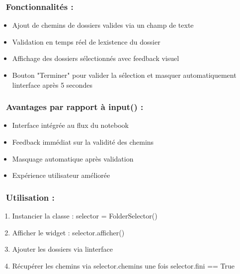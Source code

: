 \subsubsection[🔧 \textbf{Fonctionnalités
:}]{\texorpdfstring{\protect\hypertarget{anchor-56}{}{}🔧
\textbf{Fonctionnalités
:}}{🔧 Fonctionnalités :}}\label{fonctionnalituxe9s}

\begin{itemize}
\tightlist
\item
  Ajout de chemins de dossiers valides via un champ de texte
\item
  Validation en temps réel de l\textquotesingle existence du dossier
\item
  Affichage des dossiers sélectionnés avec feedback visuel
\item
  Bouton "Terminer" pour valider la sélection et masquer automatiquement
  l\textquotesingle interface après 5 secondes
\end{itemize}

\subsubsection[🧩 \textbf{Avantages par rapport à input()
:}]{\texorpdfstring{\protect\hypertarget{anchor-57}{}{}🧩
\textbf{Avantages par rapport à input()
:}}{🧩 Avantages par rapport à input() :}}\label{avantages-par-rapport-uxe0-input}

\begin{itemize}
\tightlist
\item
  Interface intégrée au flux du notebook
\item
  Feedback immédiat sur la validité des chemins
\item
  Masquage automatique après validation
\item
  Expérience utilisateur améliorée
\end{itemize}

\subsubsection[🧩\textbf{ Utilisation
:}]{\texorpdfstring{\protect\hypertarget{anchor-58}{}{}🧩\textbf{
Utilisation :}}{🧩 Utilisation :}}\label{utilisation}

\begin{enumerate}
\def\labelenumi{\arabic{enumi}.}
\setcounter{enumi}{39}
\tightlist
\item
  Instancier la classe : selector = FolderSelector()
\item
  Afficher le widget : selector.afficher()
\item
  Ajouter les dossiers via l\textquotesingle interface
\item
  Récupérer les chemins via selector.chemins une fois selector.fini ==
  True
\end{enumerate}

